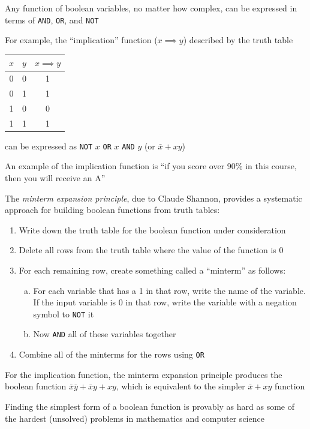\documentclass[8pt,a4paper,compress]{beamer}
\begin{document}
\begin{frame}[fragile]
Any function of boolean variables, no matter how complex, can be expressed in terms of \lstinline{AND}, \lstinline{OR}, and \lstinline{NOT}

\bigskip

For example, the ``implication'' function ($x \implies y$) described by the truth table
\begin{center}
\begin{tabular}{cc|c}
$x$ & $y$ & $x \implies y$ \\ \hline
0 & 0 & 1 \\
0 & 1 & 1 \\
1 & 0 & 0 \\
1 & 1 & 1
\end{tabular}
\end{center}
can be expressed as \lstinline{NOT} $x$ \lstinline{OR} $x$ \lstinline{AND} $y$ (or $\bar{x}+xy$)

\bigskip

An example of the implication function is ``if you score over 90\% in this course, then you will receive an A''
\end{frame}

\begin{frame}[fragile]
The \emph{minterm expansion principle}, due to Claude Shannon, provides a systematic approach for building boolean functions from truth tables:

\begin{enumerate}
\item Write down the truth table for the boolean function under consideration

\item Delete all rows from the truth table where the value of the function is 0

\item For each remaining row, create something called a ``minterm'' as follows:
\begin{enumerate}[a.]
\item For each variable that has a 1 in that row, write the name of the variable. If the input variable is 0 in that row, write the variable with a negation symbol to \lstinline{NOT} it

\item Now \lstinline{AND} all of these variables together
\end{enumerate}

\item Combine all of the minterms for the rows using \lstinline{OR}
\end{enumerate}

\bigskip

For the implication function, the minterm expansion principle produces the boolean function $\bar{x}\bar{y}+\bar{x}y+xy$, which is equivalent to the simpler $\bar{x}+xy$ function

\bigskip

Finding the simplest form of a boolean function is provably as hard as some of the hardest (unsolved) problems in mathematics and computer science
\end{frame}
\end{document}

